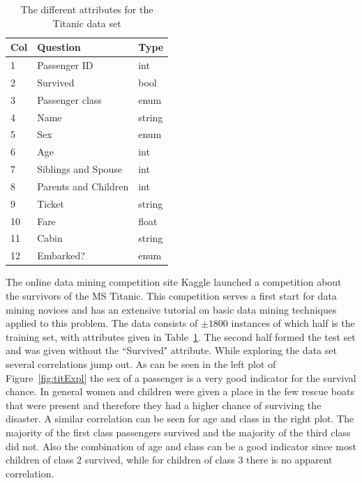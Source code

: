 \documentclass[runningheads,a4paper]{llncs}
\begin{document}
\begin{table}
\vspace{-35pt}
  \begin{tabular}{lll}\\\toprule
   Col &Question & Type\\\midrule
  	1& Passenger ID &int\\ 
  	2& Survived & bool \\ 
  3 &Passenger class &enum \\
  4 &Name &string \\
  5 &Sex &enum \\
  6 &Age &int \\
  7 &Siblings and Spouse &int \\
  8 &Parents and Children &int \\
  9 &Ticket &string\\
  10 &Fare &float \\
  11 &Cabin &string\\
  12 &Embarked? &enum\\\bottomrule
  \end{tabular}
  \caption{The different attributes for the Titanic data set}
  \label{tbl:titanic}
\end{table}
The online data mining competition site Kaggle \cite{kaggle} launched a competition about the survivors of the MS Titanic. This competition serves a first start for data mining novices and has an extensive tutorial on basic data mining techniques applied to this problem. The data consists of $\pm 1800$ instances of which half is the training set, with attributes given in Table~\ref{tbl:titanic}. The second half formed the test set and was given without the ``Survived" attribute. While exploring the data set several correlations jump out. As can be seen in the left plot of Figure~\ref{fig:titExpl} the sex of a passenger is a very good indicator for the survival chance. In general women and children were given a place in the few rescue boats that were present and therefore they had a higher chance of surviving the disaster. A similar correlation can be seen for age and class in the right plot. The majority of the first class passengers survived and the majority of the third class did not. Also the combination of age and class can be a good indicator since most children of class 2 survived, while for children of class 3 there is no apparent correlation.
\end{document}
